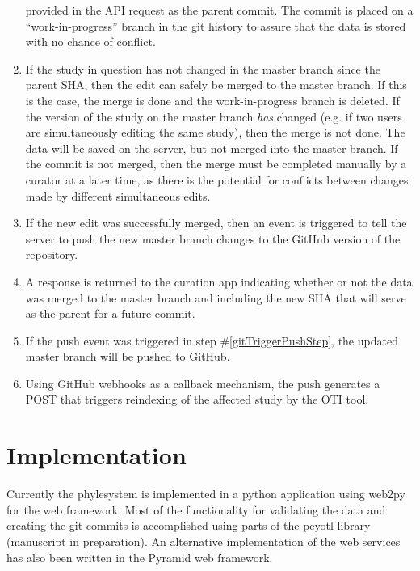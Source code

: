 \documentclass{bioinfo}
\newcommand{\ps}{phylesystem\xspace}
\begin{document}
\begin{methods}
\begin{enumerate}
        provided in the API request as the parent commit. The commit is placed on a 
        ``work-in-progress'' branch in the git history to assure that the data is stored with 
        no chance of conflict.
    \item \label{gitMergeStep} If the study in question has not changed in the master branch 
        since the parent SHA, then the edit can safely be merged to the master branch.
        If this is the case, the merge is done and the work-in-progress branch is deleted.
        If the version of the study on the master branch {\em has} changed (e.g. if two users are simultaneously editing the same study),
        then the merge is not done. The data will be saved on the server, but not merged into the master branch.
        If the commit is not merged, then the merge must be completed
        manually by a curator at a later time, 
        as there is the potential for conflicts between changes made by different simultaneous edits.
    \item\label{gitTriggerPushStep}  If the new edit was successfully merged, then an event is triggered to tell the server to push the new master branch changes to the GitHub version
        of the repository.
    \item\label{respondStep} A response is returned to the curation app indicating whether or not the data was 
        merged to the master branch and including the new SHA that will serve as the parent for a future commit.
    \item\label{pushStep}  If the push event was triggered in step \#\ref{gitTriggerPushStep}, the updated master branch will be pushed to GitHub.
    \item\label{webHookStep} Using GitHub webhooks as a callback mechanism, the push generates a POST that triggers reindexing
        of the affected study by the OTI tool.
\end{enumerate}

\section{Implementation}
Currently the \ps is implemented in a python application using web2py for the web framework.
Most of the functionality for validating the data and creating the git commits is accomplished using
    parts of the peyotl library (manuscript in preparation).
An alternative implementation of the web services has also been written in the Pyramid
    web framework.


\end{methods}
\end{document}
